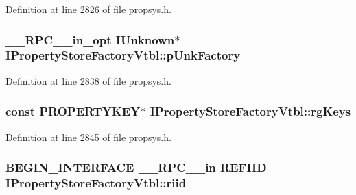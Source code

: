 Definition at line 2826 of file propsys.\+h.

\subsubsection[{\texorpdfstring{p\+Unk\+Factory}{pUnkFactory}}]{ {\bf \+\_\+\+\_\+\+R\+P\+C\+\_\+\+\_\+in\+\_\+opt} I\+Unknown$\ast$ I\+Property\+Store\+Factory\+Vtbl\+::p\+Unk\+Factory}\hypertarget{struct_i_property_store_factory_vtbl_a1021fc2258cb3e95b1e29b80da0b0ad7}{}\label{struct_i_property_store_factory_vtbl_a1021fc2258cb3e95b1e29b80da0b0ad7}


Definition at line 2838 of file propsys.\+h.

\subsubsection[{\texorpdfstring{rg\+Keys}{rgKeys}}]{ {\bf const} {\bf P\+R\+O\+P\+E\+R\+T\+Y\+K\+EY}$\ast$ I\+Property\+Store\+Factory\+Vtbl\+::rg\+Keys}\hypertarget{struct_i_property_store_factory_vtbl_ae056114f60b918f3a922e582300bf045}{}\label{struct_i_property_store_factory_vtbl_ae056114f60b918f3a922e582300bf045}


Definition at line 2845 of file propsys.\+h.

\subsubsection[{\texorpdfstring{riid}{riid}}]{\setlength{\rightskip}{0pt plus 5cm}B\+E\+G\+I\+N\+\_\+\+I\+N\+T\+E\+R\+F\+A\+CE {\bf \+\_\+\+\_\+\+R\+P\+C\+\_\+\+\_\+in} {\bf R\+E\+F\+I\+ID} I\+Property\+Store\+Factory\+Vtbl\+::riid}\hypertarget{struct_i_property_store_factory_vtbl_af8f6e7659c1fbc799ee82830f6b8250b}{}\label{struct_i_property_store_factory_vtbl_af8f6e7659c1fbc799ee82830f6b8250b}



